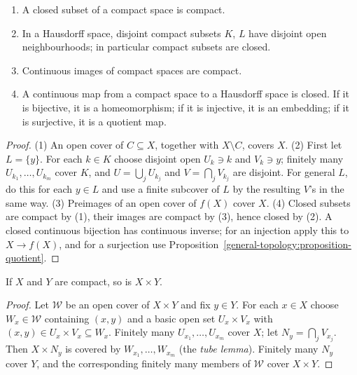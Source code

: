\begin{proposition}\label{general-topology:proposition-compact-basic}
\begin{enumerate}
\item A closed subset of a compact space is compact.
\item In a Hausdorff space, disjoint compact subsets $K$, $L$ have disjoint open neighbourhoods; in particular compact subsets are closed.
\item Continuous images of compact spaces are compact.
\item A continuous map from a compact space to a Hausdorff space is closed. If it is bijective, it is a homeomorphism; if it is injective, it is an
embedding; if it is surjective, it is a quotient map.
\end{enumerate}
\end{proposition}

\begin{proof}
(1) An open cover of $C \subseteq X$, together with $X \setminus C$, covers $X$. (2) First let $L = \{y\}$. For each $k \in K$ choose disjoint open
$U_k \ni k$ and $V_k \ni y$; finitely many $U_{k_1}, \ldots, U_{k_m}$ cover $K$, and $U = \bigcup_j U_{k_j}$ and $V = \bigcap_j V_{k_j}$ are disjoint.
For general $L$, do this for each $y \in L$ and use a finite subcover of $L$ by the resulting $V$'s in the same way. (3) Preimages of an open cover of
$f(X)$ cover $X$. (4) Closed subsets are compact by (1), their images are compact by (3), hence closed by (2). A closed continuous bijection has continuous
inverse; for an injection apply this to $X \to f(X)$, and for a surjection use Proposition~\ref{general-topology:proposition-quotient}.
\end{proof}

\begin{proposition}\label{general-topology:proposition-finite-products}
If $X$ and $Y$ are compact, so is $X \times Y$.
\end{proposition}

\begin{proof}
Let $\mathcal{W}$ be an open cover of $X \times Y$ and fix $y \in Y$. For each $x \in X$ choose $W_x \in \mathcal{W}$ containing $(x, y)$ and a basic open
set $U_x \times V_x$ with $(x, y) \in U_x \times V_x \subseteq W_x$. Finitely many $U_{x_1}, \ldots, U_{x_m}$ cover $X$; let $N_y = \bigcap_j V_{x_j}$. Then
$X \times N_y$ is covered by $W_{x_1}, \ldots, W_{x_m}$ (the \emph{tube lemma}). Finitely many $N_y$ cover $Y$, and the corresponding finitely many
members of $\mathcal{W}$ cover $X \times Y$.
\end{proof}

